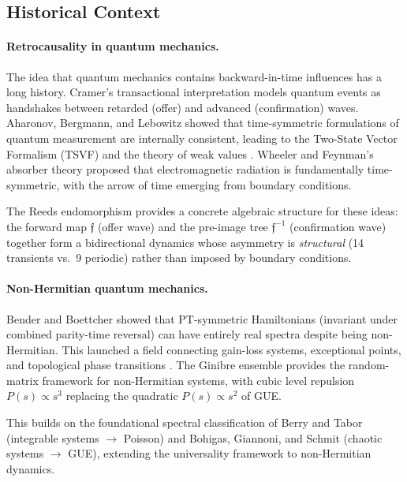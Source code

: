 \documentclass[12pt,a4paper]{article}
\theoremstyle{definition}
\theoremstyle{remark}
\newcommand{\Reeds}{\mathfrak{f}}
\begin{document}
\subsection{Historical Context}

\paragraph{Retrocausality in quantum mechanics.}
The idea that quantum mechanics contains backward-in-time influences has a long
history. Cramer's transactional interpretation \cite{cramer1986} models quantum
events as handshakes between retarded (offer) and advanced (confirmation) waves.
Aharonov, Bergmann, and Lebowitz \cite{aharonov1964} showed that time-symmetric
formulations of quantum measurement are internally consistent, leading to the
Two-State Vector Formalism (TSVF) and the theory of weak values
\cite{aharonov1988}. Wheeler and Feynman's absorber theory \cite{wheeler1945}
proposed that electromagnetic radiation is fundamentally time-symmetric, with
the arrow of time emerging from boundary conditions.

The Reeds endomorphism provides a concrete algebraic structure for these ideas:
the forward map $\Reeds$ (offer wave) and the pre-image tree $\Reeds^{-1}$
(confirmation wave) together form a bidirectional dynamics whose asymmetry
is \emph{structural} (14 transients vs.\ 9 periodic) rather than imposed by
boundary conditions.

\paragraph{Non-Hermitian quantum mechanics.}
Bender and Boettcher \cite{bender1998} showed that PT-symmetric Hamiltonians
(invariant under combined parity-time reversal) can have entirely real spectra
despite being non-Hermitian. This launched a field connecting gain-loss systems,
exceptional points, and topological phase transitions \cite{bender2007,
mostafazadeh2002}. The Ginibre ensemble \cite{ginibre1965} provides the
random-matrix framework for non-Hermitian systems, with cubic level repulsion
$P(s) \propto s^3$ replacing the quadratic $P(s) \propto s^2$ of GUE.

This builds on the foundational spectral classification of Berry and Tabor
\cite{berry_tabor1977} (integrable systems $\to$ Poisson) and Bohigas, Giannoni,
and Schmit \cite{bgs1984} (chaotic systems $\to$ GUE), extending the universality
framework to non-Hermitian dynamics.
\end{document}
